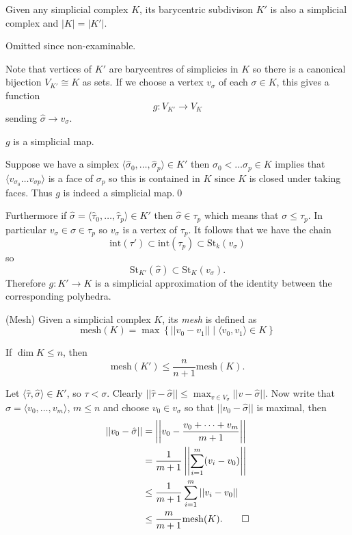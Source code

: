 \documentclass{article}
\begin{document}
\begin{proposition}
  Given any simplicial complex $ K $, its barycentric subdivison $ K' $ is also a simplicial complex and $ |K| = |K'| $.
\end{proposition}
\pf Omitted since non-examinable.
\begin{example}
	Note that vertices of $ K' $ are barycentres of simplicies in $ K $ so there is a canonical bijection $ V_{K'} \cong K $ as sets. If we choose a vertex $ v_\sigma $ of each $ \sigma\in K $, this gives a function 
	\[
		g:V_{K'} \to V_K
	\]
	sending $ \hat\sigma \to v_\sigma $.
	\begin{claim}
	  $ g $ is a simplicial map.
	\end{claim}
	\pf Suppose we have a simplex $ \langle\hat\sigma_0,\dots, \hat\sigma_p\rangle \in K' $ then $ \sigma_0 < \dots \sigma_p \in K $ implies that $ \langle v_{\sigma_0}\dots v_{\sigma p}\rangle $ is a face of $ \sigma_p $ so this is contained in $ K $ since $ K $ is closed under taking faces. Thus $ g $ is indeed a simplicial map.\qed\par
	Furthermore if $ \hat\sigma = \langle \hat \tau_0,\dots, \hat\tau_p\rangle \in K' $ then $ \hat\sigma\in \tau_p $ which means that $ \sigma\le \tau_p $. In particular $ v_\sigma \in \sigma\in \tau_p  $ so $ v_\sigma $ is a vertex of $ \tau_p $. It follows that we have the chain
	\[
		\mathrm{int}(\tau')\subset \mathrm{int}(\tau_p)\subset\mathrm{St}_k(v_\sigma)
	\]
	so
	\[
		\mathrm{St}_{K'}(\hat\sigma) \subset \mathrm{St}_K(v_\sigma).
	\]
	Therefore $ g:K'\to K $ is a simplicial approximation of the identity between the corresponding polyhedra.
\end{example}
\begin{definition}
	(Mesh) Given a simplicial complex $ K $, its \textit{mesh} is defined as 
	\[
		\mathrm{mesh}(K) = \max \left\{ ||v_0-v_1||\mid \langle v_0, v_1\rangle \in K\right\}
	\]
\end{definition}
\begin{lemma}
  If $ \dim K \le n $, then 
  \[
	  \mathrm{mesh}(K') \le \frac n{n+1}\mathrm{mesh}(K).
  \]
\end{lemma}
\pf Let $ \langle \hat \tau, \hat \sigma\rangle \in K' $, so $ \tau < \sigma $. Clearly $ ||\hat\tau-\hat\sigma||\le \max_{v\in V_\sigma} ||v-\hat\sigma|| $. Now write that $ \sigma = \langle v_0,\dots, v_m\rangle $, $ m\le n $ and choose $ v_0\in v_\sigma $ so that $ ||v_0-\hat\sigma|| $ is maximal, then
\begin{align*}
	||v_0-\hat\sigma|| &= \left|\left|v_0 -\frac{v_0+\dots + v_m}{m+1}\right|\right| \\
			   &= \frac 1{m+1}\left|\left|\sum_{i=1}^m (v_i-v_0)\right|\right| \\
			   &\le \frac 1{m+1} \sum_{i=1}^m ||v_i-v_0|| \\
			   &\le \frac m{m+1} \mathrm{mesh}(K).\qed
\end{align*}
\end{document}
